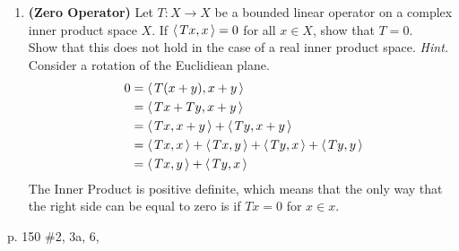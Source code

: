 \documentclass[10pt,a4paper]{report}
\begin{document}
\begin{enumerate}
	\item \textbf{(Zero Operator)}  Let $T: X \to X$ be a bounded linear operator on a complex inner product space $X$.  If $\left \langle\, Tx,x \,\right \rangle = 0$ for all $x \in X$, show that $T=0$.\\
	Show that this does not hold in the case of a real inner product space. \textit{Hint.} Consider a rotation of the Euclidiean plane.
	\begin{align*}
		0 &= \left \langle\, T(x+y),x+y \,\right \rangle \\
		&= \left \langle\, Tx+Ty, x+y \,\right \rangle \\
		&= \left \langle\, Tx, x+y \,\right \rangle+\left \langle\, Ty,x+y \,\right \rangle \\
		&= \left \langle\, Tx,x \,\right \rangle + \left \langle\, Tx,y \,\right \rangle + \left \langle\, Ty,x \,\right \rangle + \left \langle\, Ty,y \,\right \rangle\\
		&= \left \langle\, Tx,y \,\right \rangle + \left \langle\, Ty,x \,\right \rangle
	\end{align*}The Inner Product is positive definite, which means that the only way that the right side can be equal to zero is if $Tx=0$ for $x\in x$.
\end{enumerate}
\newpage
p. 150 \#2, 3a, 6, 
\end{document}
